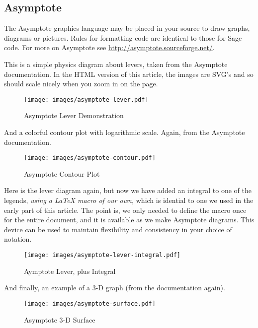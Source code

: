 \documentclass[10pt,]{article}
\theoremstyle{plain}
\theoremstyle{definition}
\theoremstyle{definition}
\theoremstyle{definition}
\theoremstyle{definition}
\theoremstyle{definition}
\theoremstyle{definition}
\numberwithin{equation}{section}
\begin{document}
\subsection[{Asymptote}]{Asymptote}\label{subsection-21}
\hypertarget{p-259}{}%
The Asymptote graphics language may be placed in your source to draw graphs, diagrams or pictures.  Rules for formatting code are identical to those for Sage code.  For more on Asymptote see \url{http://asymptote.sourceforge.net/}.%
\par
\hypertarget{p-260}{}%
This is a simple physics diagram about levers, taken from the Asymptote documentation.  In the HTML version of this article, the images are SVG's and so should scale nicely when you zoom in on the page.%
\begin{figure}
\centering
\texttt{[image: images/asymptote-lever.pdf]}
\caption{Asymptote Lever Demonstration\label{figure-asymptote-levers}}
\end{figure}
\hypertarget{p-261}{}%
And a colorful contour plot with logarithmic scale.  Again, from the Asymptote documentation.%
\begin{figure}
\centering
\texttt{[image: images/asymptote-contour.pdf]}
\caption{Asymptote Contour Plot\label{figure-asymptote-contour-plot}}
\end{figure}
\hypertarget{p-262}{}%
Here is the lever diagram again, but now we have added an integral to one of the legends, \emph{using a \LaTeX{} macro of our own,} which is idential to one we used in the early part of this article.  The point is, we only needed to define the macro once for the entire document, and it is available as we make Asymptote diagrams.  This device can be used to maintain flexibility and consistency in your choice of notation.%
\begin{figure}
\centering
\texttt{[image: images/asymptote-lever-integral.pdf]}
\caption{Aymptote Lever, plus Integral\label{figure-asymptote-latex-macro}}
\end{figure}
\hypertarget{p-263}{}%
And finally, an example of a 3-D graph (from the documentation again).%
\begin{figure}
\centering
\texttt{[image: images/asymptote-surface.pdf]}
\caption{Asymptote 3-D Surface\label{figure-asymptote-surface}}
\end{figure}
\typeout{************************************************}
\typeout{************************************************}
\end{document}
